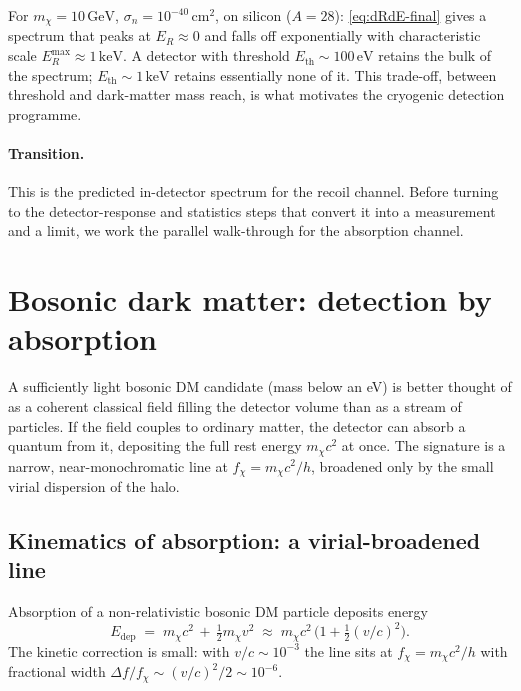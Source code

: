 \begin{example}
\label{ex:Si-spectrum}
For $m_\chi=10\,\text{GeV}$, $\sigma_n=10^{-40}\,\text{cm}^2$, on
silicon ($A=28$): \cref{eq:dRdE-final} gives a spectrum that peaks
at $E_R\approx 0$ and falls off exponentially with characteristic
scale $E_R^\text{max}\approx 1\,\text{keV}$. A detector with
threshold $E_\text{th}\sim 100\,\text{eV}$ retains the bulk of the
spectrum; $E_\text{th}\sim 1\,\text{keV}$ retains essentially none
of it. This trade-off, between threshold and dark-matter mass
reach, is what motivates the cryogenic detection programme.
\end{example}

\paragraph{Transition.}
This is the predicted in-detector spectrum for the recoil channel.
Before turning to the detector-response and statistics steps that
convert it into a measurement and a limit, we work the parallel
walk-through for the absorption channel.

\section{Bosonic dark matter: detection by absorption}
\label{sec:boson-dm}

\begin{phenomenon}
A sufficiently light bosonic DM candidate (mass below an eV) is
better thought of as a coherent classical field filling the
detector volume than as a stream of particles. If the field couples
to ordinary matter, the detector can absorb a quantum from it,
depositing the full rest energy $m_\chi c^2$ at once. The signature
is a narrow, near-monochromatic line at $f_\chi=m_\chi c^2/h$,
broadened only by the small virial dispersion of the halo.
\end{phenomenon}

\subsection{Kinematics of absorption: a virial-broadened line}
\label{sec:absorption-kinematics}

\begin{statement}
\label{stmt:line}
Absorption of a non-relativistic bosonic DM particle deposits
energy
\begin{equation}
\label{eq:E-deposited}
E_\text{dep} \;=\; m_\chi c^2 \,+\, \tfrac12 m_\chi v^2
\;\approx\; m_\chi c^2\,\bigl(1+\tfrac{1}{2}(v/c)^2\bigr).
\end{equation}
The kinetic correction is small: with $v/c\sim 10^{-3}$ the line
sits at $f_\chi=m_\chi c^2/h$ with fractional width
$\Delta f/f_\chi \sim (v/c)^2/2 \sim 10^{-6}$.
\end{statement}

